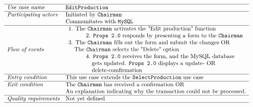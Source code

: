 \documentclass[12pt]{article}
\begin{document}
\[
\begin{array}{ll}
\hline
\textit{Use case name} & \texttt{EditProduction} \\
\hline
\textit{Participating actors} & \text{Initiated by \texttt{Chairman}} \\
& \text{Communitates with \texttt{MySQL}} \\
\hline
\textit{Flow of events} & 
\begin{array}{l}
\text{1. The \texttt{Chairman} activates the "Edit production" function} \\
\quad \quad \quad \text{2. \texttt{Props 2.0} responds by presenting a form to the \texttt{Chairman}}\\
\text{3. The \texttt{Chairman} fills out the form and submit the changes OR} \\ \quad \text{The \texttt{Chairman} selects the "Delete" option} \\
\quad \quad \quad \text{4. \texttt{Props 2.0} receives the form, and the MySQL database} \\ \quad \quad \quad \quad \text{gets updated. \texttt{Props 2.0} displays a update- OR}\\\quad \quad \quad \quad \text{delete-comfirmation} 
\end{array} \\
\hline
\textit{Entry condition} & \text{This use case extends the  \texttt{SelectProduction} use case} \\
\hline
\textit{Exit condition} & \text{The \texttt{Chairman} has received a confirmation OR} \\ & \text{An explanation indicating why the transaction could not be processed.} \\
\hline
\textit{Quality requirements} & \text{Not yet defined} \\
\hline
\end{array}
\]
\end{document}
